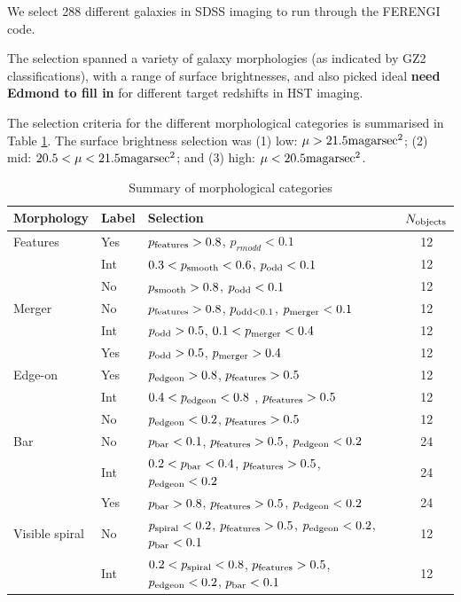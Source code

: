 \documentclass[usenatbib]{mn2e}
\begin{document}
We select 288 different galaxies in SDSS imaging to run through the FERENGI code.

The selection spanned a variety of galaxy morphologies (as indicated by GZ2 classifications), with a range of surface brightnesses, and also picked ideal {\bf need Edmond to fill in} for different target redshifts in HST imaging. 

 The selection criteria for the different morphological categories is summarised in Table \ref{morphologies}. The surface brightness selection was (1) low: $\mu > 21.5 {\rm mag arsec}^2$;  (2) mid: $20.5 < \mu < 21.5 {\rm mag arsec}^2$; and (3) high: $\mu < 20.5 {\rm mag arsec}^2$. 
 
\begin{table}
\caption{Summary of morphological categories \label{morphologies}}
\begin{tabular}{lllc}
\hline\hline
Morphology & Label &  Selection & $N_{\rm objects}$ \\
\hline
Features & Yes & $p_{\rm features} > 0.8$, $p_{rm odd} < 0.1$ & 12 \\ 
 & Int & $0.3 < p_{\rm smooth} < 0.6$, $p_{\rm odd} < 0.1$ & 12 \\ 
 & No &  $p_{\rm smooth} > 0.8$, $p_{\rm odd} < 0.1$ & 12 \\ 
Merger & No & $p_{\rm features} > 0.8$, $p_{\rm odd < 0.1}$, $p_{\rm merger} < 0.1$ & 12\\
& Int & $p_{\rm odd} > 0.5$, $0.1< p_{\rm merger} < 0.4$ & 12 \\ 
& Yes & $p_{\rm odd} > 0.5$, $p_{\rm merger} > 0.4$ & 12\\
Edge-on & Yes &  $p_{\rm edgeon} > 0.8$, $p_{\rm features} > 0.5$ & 12 \\
& Int & $0.4 < p_{\rm edgeon} < 0.8$ , $p_{\rm features} > 0.5$ & 12 \\
& No & $p_{\rm edgeon} < 0.2$, $p_{\rm features} > 0.5$ & 12 \\
Bar & No & $p_{\rm bar} < 0.1$, $p_{\rm features} > 0.5$, $p_{\rm edgeon} < 0.2$ & 24 \\
& Int & $0.2 < p_{\rm bar} < 0.4$, $p_{\rm features} > 0.5$, $p_{\rm edgeon} < 0.2$ & 24 \\
& Yes&  $p_{\rm bar} > 0.8$, $p_{\rm features} > 0.5$, $p_{\rm edgeon} < 0.2$ & 24 \\
Visible spiral & No & $p_{\rm spiral} < 0.2$, $p_{\rm features} > 0.5$, $p_{\rm edgeon} < 0.2$, $p_{\rm bar} < 0.1$ & 12 \\
& Int &  $0.2 < p_{\rm spiral} < 0.8$, $p_{\rm features} > 0.5$, $p_{\rm edgeon} < 0.2$, $p_{\rm bar} < 0.1$ & 12 \\

\end{tabular}
\end{table}
\end{document}
